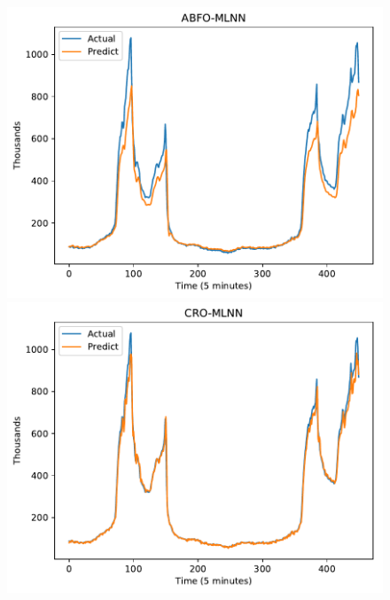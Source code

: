 \documentclass[review,3p,authoryear]{elsarticle}
\begin{document}
{\begin{figure}[!ht]
\begin{minipage}[b]{0.33\linewidth}
  \end{minipage} 
  
  \begin{minipage}[b]{0.33\linewidth}
    \centering
    \includegraphics[width=0.9\linewidth]{images/pdf/predict/k5/wc_k5_abfo_mlnn.pdf} 
  \end{minipage}
  \begin{minipage}[b]{0.33\linewidth}
    \centering
    \includegraphics[width=0.9\linewidth]{images/pdf/predict/k5/wc_k5_cro_mlnn.pdf} 
  \end{minipage} 
  \begin{minipage}[b]{0.33\linewidth}
    \centering

\end{minipage}
\end{figure}}
\end{document}
